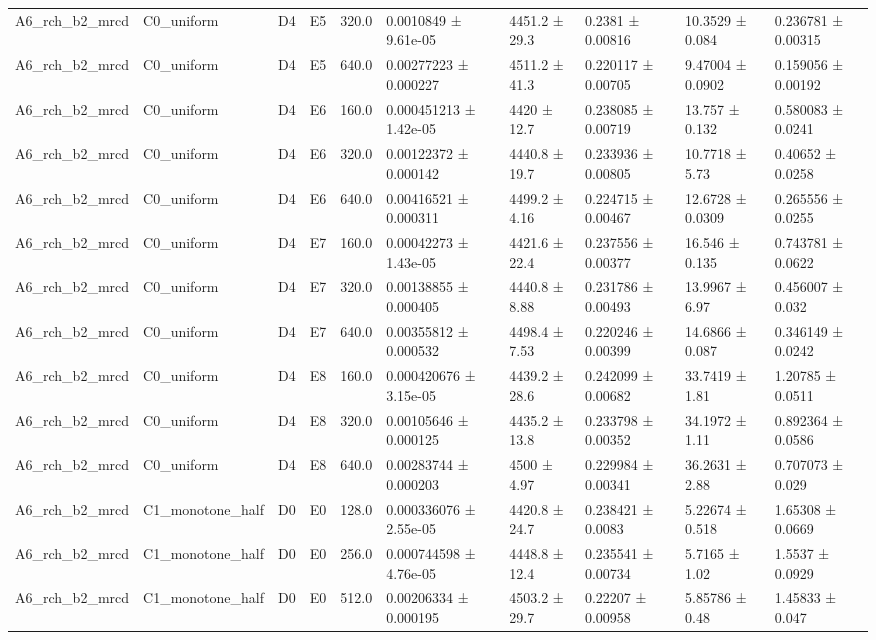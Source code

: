 \begin{table}
\begin{tabular}{llllllllll}
A6\_rch\_b2\_mrcd & C0\_uniform & D4 & E5 & 320.0 & 0.0010849 ± 9.61e-05 & 4451.2 ± 29.3 & 0.2381 ± 0.00816 & 10.3529 ± 0.084 & 0.236781 ± 0.00315 \\
A6\_rch\_b2\_mrcd & C0\_uniform & D4 & E5 & 640.0 & 0.00277223 ± 0.000227 & 4511.2 ± 41.3 & 0.220117 ± 0.00705 & 9.47004 ± 0.0902 & 0.159056 ± 0.00192 \\
A6\_rch\_b2\_mrcd & C0\_uniform & D4 & E6 & 160.0 & 0.000451213 ± 1.42e-05 & 4420 ± 12.7 & 0.238085 ± 0.00719 & 13.757 ± 0.132 & 0.580083 ± 0.0241 \\
A6\_rch\_b2\_mrcd & C0\_uniform & D4 & E6 & 320.0 & 0.00122372 ± 0.000142 & 4440.8 ± 19.7 & 0.233936 ± 0.00805 & 10.7718 ± 5.73 & 0.40652 ± 0.0258 \\
A6\_rch\_b2\_mrcd & C0\_uniform & D4 & E6 & 640.0 & 0.00416521 ± 0.000311 & 4499.2 ± 4.16 & 0.224715 ± 0.00467 & 12.6728 ± 0.0309 & 0.265556 ± 0.0255 \\
A6\_rch\_b2\_mrcd & C0\_uniform & D4 & E7 & 160.0 & 0.00042273 ± 1.43e-05 & 4421.6 ± 22.4 & 0.237556 ± 0.00377 & 16.546 ± 0.135 & 0.743781 ± 0.0622 \\
A6\_rch\_b2\_mrcd & C0\_uniform & D4 & E7 & 320.0 & 0.00138855 ± 0.000405 & 4440.8 ± 8.88 & 0.231786 ± 0.00493 & 13.9967 ± 6.97 & 0.456007 ± 0.032 \\
A6\_rch\_b2\_mrcd & C0\_uniform & D4 & E7 & 640.0 & 0.00355812 ± 0.000532 & 4498.4 ± 7.53 & 0.220246 ± 0.00399 & 14.6866 ± 0.087 & 0.346149 ± 0.0242 \\
A6\_rch\_b2\_mrcd & C0\_uniform & D4 & E8 & 160.0 & 0.000420676 ± 3.15e-05 & 4439.2 ± 28.6 & 0.242099 ± 0.00682 & 33.7419 ± 1.81 & 1.20785 ± 0.0511 \\
A6\_rch\_b2\_mrcd & C0\_uniform & D4 & E8 & 320.0 & 0.00105646 ± 0.000125 & 4435.2 ± 13.8 & 0.233798 ± 0.00352 & 34.1972 ± 1.11 & 0.892364 ± 0.0586 \\
A6\_rch\_b2\_mrcd & C0\_uniform & D4 & E8 & 640.0 & 0.00283744 ± 0.000203 & 4500 ± 4.97 & 0.229984 ± 0.00341 & 36.2631 ± 2.88 & 0.707073 ± 0.029 \\
A6\_rch\_b2\_mrcd & C1\_monotone\_half & D0 & E0 & 128.0 & 0.000336076 ± 2.55e-05 & 4420.8 ± 24.7 & 0.238421 ± 0.0083 & 5.22674 ± 0.518 & 1.65308 ± 0.0669 \\
A6\_rch\_b2\_mrcd & C1\_monotone\_half & D0 & E0 & 256.0 & 0.000744598 ± 4.76e-05 & 4448.8 ± 12.4 & 0.235541 ± 0.00734 & 5.7165 ± 1.02 & 1.5537 ± 0.0929 \\
A6\_rch\_b2\_mrcd & C1\_monotone\_half & D0 & E0 & 512.0 & 0.00206334 ± 0.000195 & 4503.2 ± 29.7 & 0.22207 ± 0.00958 & 5.85786 ± 0.48 & 1.45833 ± 0.047 \\

\end{tabular}
\end{table}

